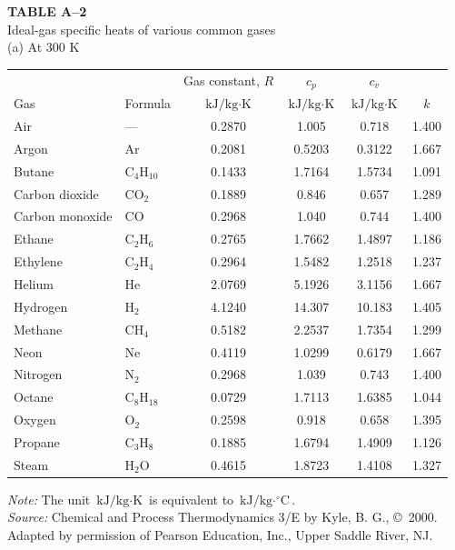 \documentclass[12pt,a3paper]{article}
\begin{document}
\begin{enumerate}
\noindent\textbf{\Large TABLE A--2} \\
\noindent Ideal-gas specific heats of various common gases \\
\noindent (a) At 300 K
\vspace{0.3cm}

\begin{center}
\begin{tabular}{llcccc}
\toprule\toprule
& & Gas constant, $R$ & $c_p$ & $c_v$ & \\
Gas & Formula & $\text{kJ/kg}\cdot\text{K}$ & $\text{kJ/kg}\cdot\text{K}$ & $\text{kJ/kg}\cdot\text{K}$ & $k$ \\
\midrule
Air & --- & 0.2870 & 1.005 & 0.718 & 1.400 \\
Argon & Ar & 0.2081 & 0.5203 & 0.3122 & 1.667 \\
Butane & $\mathrm{C_4H_{10}}$ & 0.1433 & 1.7164 & 1.5734 & 1.091 \\
Carbon dioxide & $\mathrm{CO_2}$ & 0.1889 & 0.846 & 0.657 & 1.289 \\
Carbon monoxide & CO & 0.2968 & 1.040 & 0.744 & 1.400 \\
Ethane & $\mathrm{C_2H_6}$ & 0.2765 & 1.7662 & 1.4897 & 1.186 \\
Ethylene & $\mathrm{C_2H_4}$ & 0.2964 & 1.5482 & 1.2518 & 1.237 \\
Helium & He & 2.0769 & 5.1926 & 3.1156 & 1.667 \\
Hydrogen & $\mathrm{H_2}$ & 4.1240 & 14.307 & 10.183 & 1.405 \\
Methane & $\mathrm{CH_4}$ & 0.5182 & 2.2537 & 1.7354 & 1.299 \\
Neon & Ne & 0.4119 & 1.0299 & 0.6179 & 1.667 \\
Nitrogen & $\mathrm{N_2}$ & 0.2968 & 1.039 & 0.743 & 1.400 \\
Octane & $\mathrm{C_8H_{18}}$ & 0.0729 & 1.7113 & 1.6385 & 1.044 \\
Oxygen & $\mathrm{O_2}$ & 0.2598 & 0.918 & 0.658 & 1.395 \\
Propane & $\mathrm{C_3H_8}$ & 0.1885 & 1.6794 & 1.4909 & 1.126 \\
Steam & $\mathrm{H_2O}$ & 0.4615 & 1.8723 & 1.4108 & 1.327 \\
\bottomrule\bottomrule
\end{tabular}
\end{center}

\vspace{0.1cm}
\noindent\footnotesize \textit{Note:} The unit $\text{kJ/kg}\cdot\text{K}$ is equivalent to $\text{kJ/kg}\cdot^\circ\text{C}$. \\
\textit{Source:} Chemical and Process Thermodynamics 3/E by Kyle, B. G., \copyright~2000. Adapted by permission of Pearson Education, Inc., Upper Saddle River, NJ.



\end{enumerate}
\end{document}
